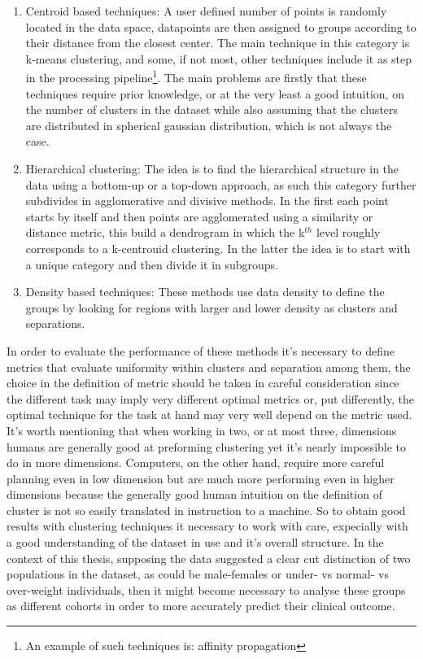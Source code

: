 \begin{enumerate}
\item Centroid based techniques: A user defined number of points is randomly located in the data space, datapoints are then assigned to groups according to their distance from the closest center. The main technique in this category is k-means clustering, and some, if not most, other techniques include it as step in the processing pipeline\footnote{An example of such techniques is: affinity propagation}. The main problems are firstly that these techniques require prior knowledge, or at the very least a good intuition, on the number of clusters in the dataset  while also assuming that the clusters are distributed in spherical gaussian distribution, which is not always the case.	
\item Hierarchical clustering: The idea is to find the hierarchical structure in the data using a bottom-up or a top-down approach, as such this category further subdivides in agglomerative and divisive methods. In the first each point starts by itself and then points are agglomerated using a similarity or distance metric, this build a dendrogram in which the k$^{th}$ level roughly corresponds to a k-centrouid clustering. In the latter the idea is to start with a unique category and then divide it in subgroups.
\item Density based techniques: These methods use data density to define the groups by looking for regions with larger and lower density as clusters and separations.
\end{enumerate}

In order to evaluate the performance of these methods it's necessary to define metrics that evaluate uniformity within clusters and separation among them, the choice in the definition of metric should be taken in careful consideration since the different task may imply very different optimal metrics or, put differently, the optimal technique for the task at hand may very well depend on the metric used.
It's worth mentioning that when working in two, or at most three, dimensions humans are generally good at preforming clustering yet it's nearly impossible to do in more dimensions. Computers, on the other hand, require more careful planning even in low dimension but are much more performing even in higher dimensions because the generally good human intuition on the definition of cluster is not so easily translated in instruction to a machine. So to obtain good results with clustering techniques it necessary to work with care, expecially with a good understanding of the dataset in use and it's overall structure.
In the context of this thesis, supposing the data suggested a clear cut distinction of two populations in the dataset, as could be male-females or under- vs  normal- vs over-weight individuals, then it might become necessary to analyse these groups as different  cohorts in order to more accurately predict their clinical outcome. 


